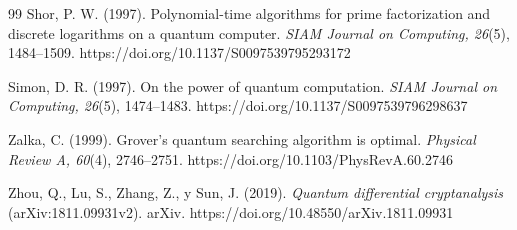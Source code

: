 \begin{thebibliography}{99}
Shor, P. W. (1997). Polynomial-time algorithms for prime factorization and discrete logarithms on a quantum computer. \emph{SIAM Journal on Computing, 26}(5), 1484--1509. https://doi.org/10.1137/S0097539795293172

Simon, D. R. (1997). On the power of quantum computation. \emph{SIAM Journal on Computing, 26}(5), 1474--1483. https://doi.org/10.1137/S0097539796298637

Zalka, C. (1999). Grover's quantum searching algorithm is optimal. \emph{Physical Review A, 60}(4), 2746--2751. https://doi.org/10.1103/PhysRevA.60.2746

Zhou, Q., Lu, S., Zhang, Z., y Sun, J. (2019). \emph{Quantum differential cryptanalysis} (arXiv:1811.09931v2). arXiv. https://doi.org/10.48550/arXiv.1811.09931

\end{thebibliography}
